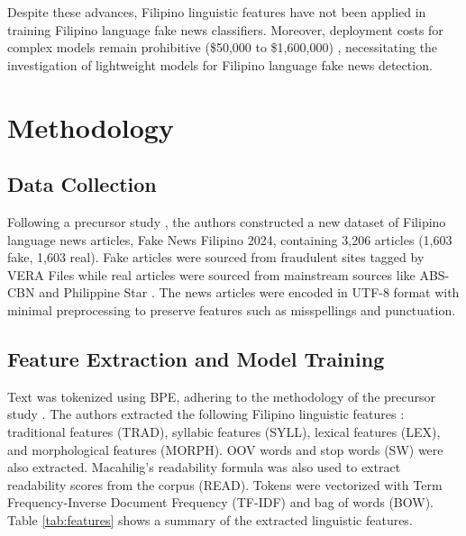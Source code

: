 \documentclass[conference]{IEEEtran}
\begin{document}
Despite these advances, Filipino linguistic features have not been applied in training Filipino language fake news classifiers. Moreover, deployment costs for complex models remain prohibitive (\$50,000 to \$1,600,000) \cite{b4}, necessitating the investigation of lightweight models for Filipino language fake news detection.

\section{Methodology}

\subsection{Data Collection}
Following a precursor study \cite{b3}, the authors constructed a new dataset of Filipino language news articles, Fake News Filipino 2024, containing 3,206 articles (1,603 fake, 1,603 real). Fake articles were sourced from fraudulent sites tagged by  VERA Files \cite{b11, b12} while real articles were sourced from mainstream sources like ABS-CBN \cite{b13} and Philippine Star \cite{b14}. The news articles were encoded in UTF-8 format with minimal preprocessing to preserve features such as misspellings and punctuation.

\subsection{Feature Extraction and Model Training}
Text was tokenized using BPE, adhering to the methodology of the precursor study \cite{b3}. The authors extracted the following Filipino linguistic features \cite{b8,b9,b10}: traditional features (TRAD), syllabic features (SYLL), lexical features (LEX), and morphological features (MORPH). OOV words and stop words (SW) were also extracted. Macahilig's readability formula \cite{b10} was also used to extract readability scores from the corpus (READ). Tokens were vectorized with Term Frequency-Inverse Document Frequency (TF-IDF) and bag of words (BOW). Table \ref{tab:features} shows a summary of the extracted linguistic features.
\end{document}
